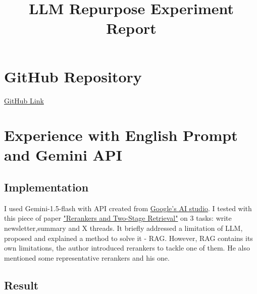 \documentclass[12pt]{article}
\begin{document}
\title{LLM Repurpose Experiment Report}
\author{}
\date{}
\maketitle

\section*{GitHub Repository}
\href{https://github.com/}{GitHub Link}

\section{Experience with English Prompt and Gemini API}

\subsection*{Implementation}

I used Gemini-1.5-flash with API created from \href{https://aistudio.google.com}{Google's AI studio}.\newline
I tested with this piece of paper \href{https://www.pinecone.io/learn/series/rag/rerankers/}{"Rerankers and Two-Stage Retrieval"} on 3 tasks: write newsletter,summary and X threads. 
It briefly addressed a limitation of LLM, proposed and explained a method to solve it - RAG. However, RAG contains its own limitations,
the author introduced rerankers to tackle one of them. He also mentioned some representative rerankers and his one.

\subsection*{Result}
\end{document}
